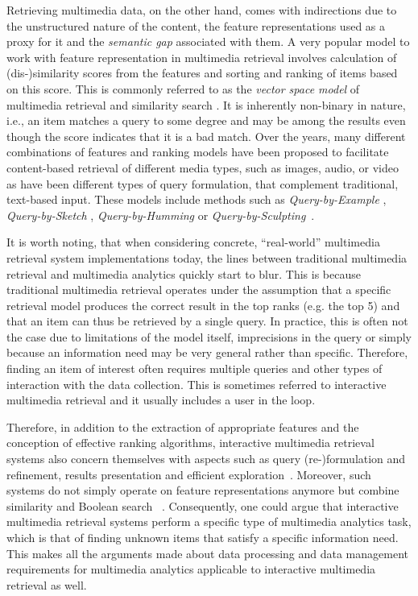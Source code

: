 Retrieving multimedia data, on the other hand, comes with indirections due to the unstructured nature of the content, the feature representations used as a proxy for it and the \emph{semantic gap} \cite{Blanken:2007multimedia, Rossetto:2018Multi} associated with them. A very popular model to work with feature representation in multimedia retrieval involves calculation of (dis-)similarity scores from the features and sorting and ranking of items based on this score. This is commonly referred to as the \emph{vector space model} of multimedia retrieval and similarity search \cite{Zezula:2006Similarity}. It is inherently non-binary in nature, i.e., an item matches a query to some degree and may be among the results even though the score indicates that it is a bad match. Over the years, many different combinations of features and ranking models have been proposed to facilitate content-based retrieval of different media types, such as images, audio, or video \cite{Hu:2011Survey,Dharani:2013Survey,Murthy:2018Content} as have been different types of query formulation, that complement traditional, text-based input. These models include methods such as \emph{Query-by-Example} \cite{Kelly:1995Query}, \emph{Query-by-Sketch} \cite{Sciascio:1999Content}, \emph{Query-by-Humming} \cite{Ghias:1995query} or \emph{Query-by-Sculpting}~\cite{Boerlin:20203d}.

It is worth noting, that when considering concrete, ``real-world'' multimedia retrieval system implementations today, the lines between traditional multimedia retrieval and multimedia analytics quickly start to blur. This is because traditional multimedia retrieval operates under the assumption that a specific retrieval model produces the correct result in the top ranks (e.g. the top 5) and that an item can thus be retrieved by a single query. In practice, this is often not the case due to limitations of the model itself, imprecisions in the query or simply because an information need may be very general rather than specific. Therefore, finding an item of interest often requires multiple queries and other types of interaction with the data collection. This is sometimes referred to interactive multimedia retrieval and it usually includes a user in the loop.

Therefore, in addition to the extraction of appropriate features and the conception of effective ranking algorithms, interactive multimedia retrieval systems also concern themselves with aspects such as query (re-)formulation and refinement, results presentation and efficient exploration~\cite{Lokovc:2019Interactive}. Moreover, such systems do not simply operate on feature representations anymore but combine similarity and Boolean search ~\cite{Rossetto:2020Interactive}. Consequently, one could argue that interactive multimedia retrieval systems perform a specific type of multimedia analytics task, which is that of finding unknown items that satisfy a specific information need. This makes all the arguments made about data processing and data management requirements for multimedia analytics applicable to interactive multimedia retrieval as well.

